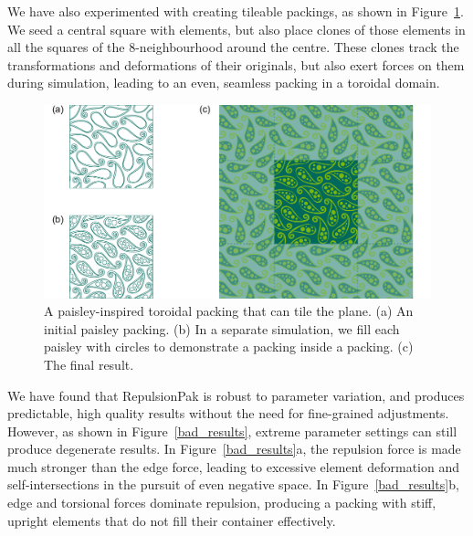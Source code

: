 We have also experimented with creating tileable packings, as shown
in Figure~\ref{paisley_packing}.  We seed a central square with elements,
but also place clones of those elements in all the squares of the
8-neighbourhood around the centre.  These clones track the transformations
and deformations of their originals, but also exert forces on them during
simulation, leading to an even, seamless packing in a toroidal domain.

\begin{figure}
\centering
\includegraphics[width=1.0\textwidth]{figures/repulsionpak/paisley_new.pdf} 
\vspace{-10pt}
\caption[A paisley-inspired toroidal packing]
{\label{paisley_packing}
A paisley-inspired toroidal packing that can tile the plane. 
           (a) An initial paisley packing.
           (b) In a separate simulation, we fill each paisley with circles to demonstrate a packing inside a packing.
           (c) The final result.
}
\end{figure}






We have found that RepulsionPak is robust to parameter variation, and 
produces predictable, high quality results without the need for fine-grained
adjustments.  However, as shown in Figure~\ref{bad_results}, extreme parameter 
settings can still produce degenerate results.
In Figure~\ref{bad_results}a, the repulsion force is made much stronger than 
the edge force, leading to excessive element deformation and
self-intersections in the pursuit of even negative space.  In 
Figure~\ref{bad_results}b, edge and torsional forces dominate repulsion,
producing a packing with stiff, upright elements that do not fill their
container effectively.


